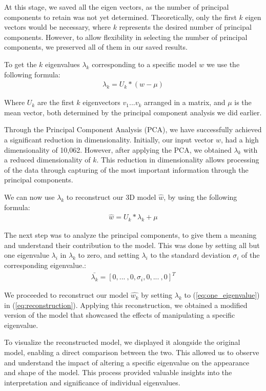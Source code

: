 At this stage, we saved all the eigen vectors, as the number of principal components to retain was not yet determined. Theoretically, only the first $k$ eigen vectors would be necessary, 
where $k$ represents the desired number of principal components. However, to allow flexibility in selecting the number of principal components, we preserved all of them in our saved results.

To get the $k$ eigenvalues $\lambda_k$ corresponding to a specific model $w$ we use the following formula: 
\begin{align}\label{eq:lambda_k}
    \lambda_k = U_k * (w - \mu)
\end{align}

Where $U_k$ are the first $k$ eigenvectors $v_1...v_k$ arranged in a matrix, and $\mu$ is the mean vector, both determined by the principal component analysis we did earlier. 

Through the Principal Component Analysis (PCA), we have successfully achieved a significant reduction in dimensionality. Initially, our input vector $w$, had a high dimensionality of 10,062. 
However, after applying the PCA, we obtained $\lambda_k$ with a reduced dimensionality of $k$. This reduction in dimensionality allows processing of the data through capturing of the most important 
information through the principal components.

We can now use $\lambda_k$ to reconstruct our 3D model $\hat{w}$, by using the following formula:
\begin{align}\label{eq:reconstruction}
    \hat{w} = U_k * \lambda_k + \mu
\end{align}


The next step was to analyze the principal components, to give them a meaning and understand their contribution to the model. This was done by setting all but one eigenvalue $\lambda_i$ in $\lambda_k$ to zero,
and setting $\lambda_i$ to the standard deviation $\sigma_i$ of the corresponding eigenvalue.:
\begin{align}\label{eq:one_eigenvalue}
    \bar{\lambda_k} = [0, ...\ , 0, \sigma_i, 0,...\ ,0]^T
\end{align}

We proceeded to reconstruct our model $\hat{w_k}$ by setting $\lambda_k$ to (\ref{eq:one_eigenvalue}) in (\ref{eq:reconstruction}). Applying this reconstruction, we obtained a modified version of the model 
that showcased the effects of manipulating a specific eigenvalue.

To visualize the reconstructed model, we displayed it alongside the original model, enabling a direct comparison between the two. This allowed us to observe and understand the impact 
of altering a specific eigenvalue on the appearance and shape of the model. This process provided valuable insights into the interpretation and significance of individual eigenvalues.

